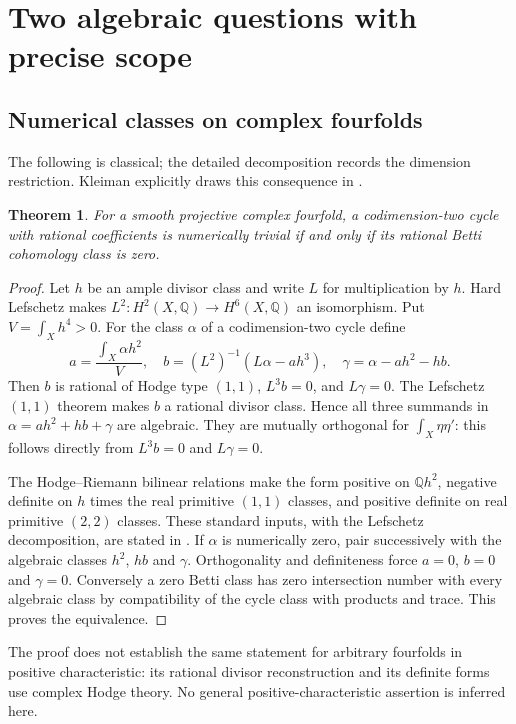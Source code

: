\documentclass[11pt,a4paper]{article}
\newtheorem{theorem}{Theorem}[section]
\theoremstyle{definition}
\newcommand{\Q}{\mathbb Q}
\begin{document}
\section{Two algebraic questions with precise scope}
\subsection{Numerical classes on complex fourfolds}
The following is classical; the detailed decomposition records the dimension restriction. Kleiman explicitly draws this consequence in \cite[\S3.10, following Propositions~3.6 and~3.8 and Corollary~3.9]{Kleiman}.
\begin{theorem}\label{thm:fourfold}
For a smooth projective complex fourfold, a codimension-two cycle with rational coefficients is numerically trivial if and only if its rational Betti cohomology class is zero.
\end{theorem}
\begin{proof}
Let $h$ be an ample divisor class and write $L$ for multiplication by $h$. Hard Lefschetz makes $L^2:H^2(X,\Q)\to H^6(X,\Q)$ an isomorphism. Put $V=\int_Xh^4>0$. For the class $\alpha$ of a codimension-two cycle define
\[
 a=\frac{\int_X\alpha h^2}{V},\quad
 b=(L^2)^{-1}(L\alpha-ah^3),\quad
 \gamma=\alpha-ah^2-hb.
\]
Then $b$ is rational of Hodge type $(1,1)$, $L^3b=0$, and $L\gamma=0$. The Lefschetz $(1,1)$ theorem makes $b$ a rational divisor class. Hence all three summands in $\alpha=ah^2+hb+\gamma$ are algebraic. They are mutually orthogonal for $\int_X\eta\eta'$: this follows directly from $L^3b=0$ and $L\gamma=0$.

The Hodge--Riemann bilinear relations make the form positive on $\Q h^2$, negative definite on $h$ times the real primitive $(1,1)$ classes, and positive definite on real primitive $(2,2)$ classes. These standard inputs, with the Lefschetz decomposition, are stated in \cite[\S2.1 and Theorems~2.10--2.12]{Voisin}. If $\alpha$ is numerically zero, pair successively with the algebraic classes $h^2$, $hb$ and $\gamma$. Orthogonality and definiteness force $a=0$, $b=0$ and $\gamma=0$. Conversely a zero Betti class has zero intersection number with every algebraic class by compatibility of the cycle class with products and trace. This proves the equivalence.
\end{proof}

The proof does not establish the same statement for arbitrary fourfolds in positive characteristic: its rational divisor reconstruction and its definite forms use complex Hodge theory. No general positive-characteristic assertion is inferred here.
\end{document}
